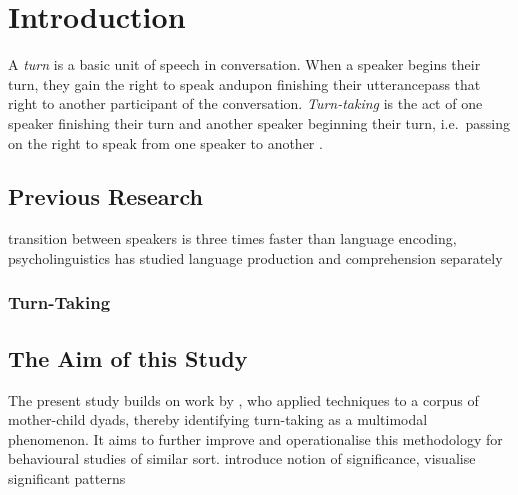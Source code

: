 
\chapter{Introduction}
A \emph{turn} is a basic unit of speech in conversation. When a speaker begins their turn, they gain the right to speak and\dash upon finishing their utterance\dash pass that right to another participant of the conversation. \emph{Turn-taking} is the act of one speaker finishing their turn and another speaker beginning their turn, i.e.~passing on the right to speak from one speaker to another \cite[]{levinson16}.

\section{Previous Research}
\cite{levinson16} transition between speakers is three times faster than language encoding, psycholinguistics has studied language production and comprehension separately

\subsection{Turn-Taking}
\cite{stivers09}

\subsection{\fpm}



\section{The Aim of this Study}
The present study builds on work by , who applied \fpm{} techniques to a corpus of mother-child dyads, thereby identifying turn-taking as a multimodal phenomenon. It aims to further improve and operationalise this methodology for behavioural studies of similar sort.
introduce notion of significance, visualise significant patterns


























